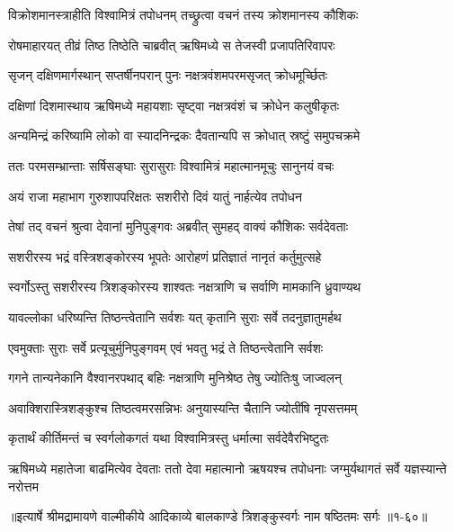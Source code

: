 \twolineshloka
{विक्रोशमानस्त्राहीति विश्वामित्रं तपोधनम्}
{तच्छ्रुत्वा वचनं तस्य क्रोशमानस्य कौशिकः} %

\twolineshloka
{रोषमाहारयत् तीव्रं तिष्ठ तिष्ठेति चाब्रवीत्}
{ऋषिमध्ये स तेजस्वी प्रजापतिरिवापरः} %

\twolineshloka
{सृजन् दक्षिणमार्गस्थान् सप्तर्षीनपरान् पुनः}
{नक्षत्रवंशमपरमसृजत् क्रोधमूर्च्छितः} %

\twolineshloka
{दक्षिणां दिशमास्थाय ऋषिमध्ये महायशाः}
{सृष्ट्वा नक्षत्रवंशं च क्रोधेन कलुषीकृतः} %

\twolineshloka
{अन्यमिन्द्रं करिष्यामि लोको वा स्यादनिन्द्रकः}
{दैवतान्यपि स क्रोधात् स्रष्टुं समुपचक्रमे} %

\twolineshloka
{ततः परमसम्भ्रान्ताः सर्षिसङ्घाः सुरासुराः}
{विश्वामित्रं महात्मानमूचुः सानुनयं वचः} %

\twolineshloka
{अयं राजा महाभाग गुरुशापपरिक्षतः}
{सशरीरो दिवं यातुं नार्हत्येव तपोधन} %

\twolineshloka
{तेषां तद् वचनं श्रुत्वा देवानां मुनिपुङ्गवः}
{अब्रवीत् सुमहद् वाक्यं कौशिकः सर्वदेवताः} %

\twolineshloka
{सशरीरस्य भद्रं वस्त्रिशङ्कोरस्य भूपतेः}
{आरोहणं प्रतिज्ञातं नानृतं कर्तुमुत्सहे} %

\twolineshloka
{स्वर्गोऽस्तु सशरीरस्य त्रिशङ्कोरस्य शाश्वतः}
{नक्षत्राणि च सर्वाणि मामकानि ध्रुवाण्यथ} %

\twolineshloka
{यावल्लोका धरिष्यन्ति तिष्ठन्त्वेतानि सर्वशः}
{यत् कृतानि सुराः सर्वे तदनुज्ञातुमर्हथ} %

\twolineshloka
{एवमुक्ताः सुराः सर्वे प्रत्यूचुर्मुनिपुङ्गवम्}
{एवं भवतु भद्रं ते तिष्ठन्त्वेतानि सर्वशः} %

\twolineshloka
{गगने तान्यनेकानि वैश्वानरपथाद् बहिः}
{नक्षत्राणि मुनिश्रेष्ठ तेषु ज्योतिःषु जाज्वलन्} %

\twolineshloka
{अवाक्शिरास्त्रिशङ्कुश्च तिष्ठत्वमरसन्निभः}
{अनुयास्यन्ति चैतानि ज्योतींषि नृपसत्तमम्} %

\twolineshloka
{कृतार्थं कीर्तिमन्तं च स्वर्गलोकगतं यथा}
{विश्वामित्रस्तु धर्मात्मा सर्वदेवैरभिष्टुतः} %

\threelineshloka
{ऋषिमध्ये महातेजा बाढमित्येव देवताः}
{ततो देवा महात्मानो ऋषयश्च तपोधनाः}
{जग्मुर्यथागतं सर्वे यज्ञस्यान्ते नरोत्तम} %


॥इत्यार्षे श्रीमद्रामायणे वाल्मीकीये आदिकाव्ये बालकाण्डे त्रिशङ्कुस्वर्गः नाम षष्ठितमः सर्गः ॥१-६०॥
